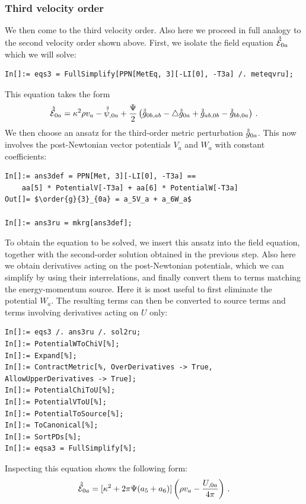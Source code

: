 \documentclass[notitlepage,a4paper,aps,prd,onecolumn,superscriptaddress,nofootinbib,groupedaddress,longbibliography]{revtex4-1}
\newcommand{\order}[2]{\accentset{#2}{#1}}
\begin{document}
\subsubsection{Third velocity order}\label{sssec:vel3}
We then come to the third velocity order. Also here we proceed in full analogy to the second velocity order shown above. First, we isolate the field equation \(\order{\mathcal{E}}{3}_{0a}\) which we will solve:
\begin{lstlisting}
In[]:= eqs3 = FullSimplify[PPN[MetEq, 3][-LI[0], -T3a] /. meteqvru];
\end{lstlisting}
This equation takes the form
\begin{equation}
\order{\mathcal{E}}{3}_{0a} = \kappa^2\rho v_a - \order{\psi}{2}_{,0a} + \frac{\Psi}{2}\left(\order{g}{3}_{0b,ab} - \triangle\order{g}{3}_{0a} + \order{g}{2}_{ab,0b} - \order{g}{2}_{bb,0a}\right)\,.
\end{equation}
We then choose an ansatz for the third-order metric perturbation \(\order{g}{3}_{0a}\). This now involves the post-Newtonian vector potentials \(V_a\) and \(W_a\) with constant coefficients:
\begin{lstlisting}
In[]:= ans3def = PPN[Met, 3][-LI[0], -T3a] ==
	aa[5] * PotentialV[-T3a] + aa[6] * PotentialW[-T3a]
Out[]= $\order{g}{3}_{0a} = a_5V_a + a_6W_a$

In[]:= ans3ru = mkrg[ans3def];
\end{lstlisting}
To obtain the equation to be solved, we insert this ansatz into the field equation, together with the second-order solution obtained in the previous step. Also here we obtain derivatives acting on the post-Newtonian potentials, which we can simplify by using their interrelations, and finally convert them to terms matching the energy-momentum source. Here it is most useful to first eliminate the potential \(W_a\). The resulting terms can then be converted to source terms and terms involving derivatives acting on \(U\) only:
\begin{lstlisting}
In[]:= eqs3 /. ans3ru /. sol2ru;
In[]:= PotentialWToChiV[%];
In[]:= Expand[%];
In[]:= ContractMetric[%, OverDerivatives -> True, AllowUpperDerivatives -> True];
In[]:= PotentialChiToU[%];
In[]:= PotentialVToU[%];
In[]:= PotentialToSource[%];
In[]:= ToCanonical[%];
In[]:= SortPDs[%];
In[]:= eqsa3 = FullSimplify[%];
\end{lstlisting}
Inspecting this equation shows the following form:
\begin{equation}
\order{\mathcal{E}}{3}_{0a} = [\kappa^2 + 2\pi\Psi(a_5 + a_6)]\left(\rho v_a - \frac{U_{,0a}}{4\pi}\right)\,.
\end{equation}
\end{document}
